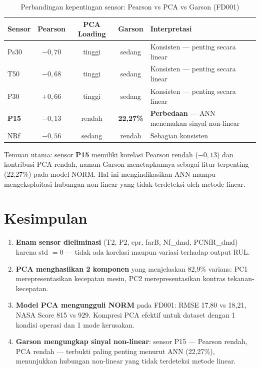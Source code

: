 \documentclass[11pt,a4paper]{article}
\begin{document}
\begin{table}[H]
\centering\small
\caption{Perbandingan kepentingan sensor: Pearson vs PCA vs Garson (FD001)}
\label{tab:three_method}
\begin{tabular}{lcccp{5cm}}
\toprule
Sensor & Pearson & PCA Loading & Garson & Interpretasi \\
\midrule
Ps30   & $-0{,}70$ & tinggi & sedang
  & Konsisten --- penting secara linear \\
T50    & $-0{,}68$ & tinggi & sedang
  & Konsisten --- penting secara linear \\
P30    & $+0{,}66$ & tinggi & sedang
  & Konsisten --- penting secara linear \\
\textbf{P15}
       & $-0{,}13$ & rendah & \textbf{22,27\%}
  & \textbf{Perbedaan} --- ANN menemukan sinyal non-linear \\
NRf    & $-0{,}56$ & sedang & rendah
  & Sebagian konsisten \\
\bottomrule
\end{tabular}
\end{table}

Temuan utama: sensor \textbf{P15} memiliki korelasi Pearson rendah
($-0{,}13$) dan kontribusi PCA rendah, namun Garson menetapkannya sebagai
fitur terpenting (22,27\%) pada model NORM. Hal ini mengindikasikan ANN
mampu mengeksploitasi hubungan non-linear yang tidak terdeteksi oleh metode
linear.

\section{Kesimpulan}

\begin{enumerate}[noitemsep]
  \item \textbf{Enam sensor dieliminasi} (T2, P2, epr, farB, Nf\_dmd,
    PCNfR\_dmd) karena std $= 0$ --- tidak ada korelasi maupun variasi
    terhadap output RUL.

  \item \textbf{PCA menghasilkan 2 komponen} yang menjelaskan 82,9\% varians:
    PC1 merepresentasikan kecepatan mesin, PC2 merepresentasikan kontras
    tekanan-kecepatan.

  \item \textbf{Model PCA mengungguli NORM} pada FD001:
    RMSE 17,80 vs 18,21, NASA Score 815 vs 929.
    Kompresi PCA efektif untuk dataset dengan 1 kondisi operasi dan
    1 mode kerusakan.

  \item \textbf{Garson mengungkap sinyal non-linear}: sensor P15 ---
    Pearson rendah, PCA rendah --- terbukti paling penting menurut ANN
    (22,27\%), menunjukkan hubungan non-linear yang tidak terdeteksi
    metode linear.
\end{enumerate}
\end{document}

